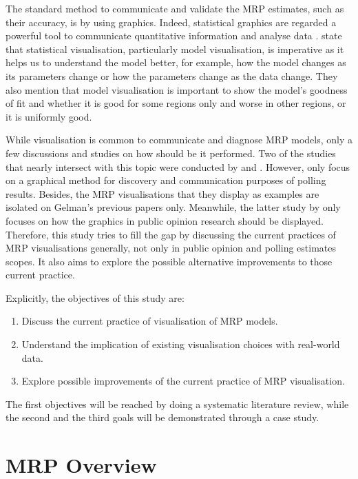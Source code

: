 \documentclass{monashthesis}
\begin{document}
The standard method to communicate and validate the MRP estimates, such as their accuracy, is by using graphics. Indeed, statistical graphics are regarded a powerful tool to communicate quantitative information and analyse data \autocite{ClevelandWilliamS,1983Gmfd}. \textcite{WickhamHadley2015VsmR} state that statistical visualisation, particularly model visualisation, is imperative as it helps us to understand the model better, for example, how the model changes as its parameters change or how the parameters change as the data change. They also mention that model visualisation is important to show the model's goodness of fit and whether it is good for some regions only and worse in other regions, or it is uniformly good.

While visualisation is common to communicate and diagnose MRP models, only a few discussions and studies on how should be it performed. Two of the studies that nearly intersect with this topic were conducted by \textcite{mekelagelman} and \textcite{saundra}. However, \textcite{mekelagelman} only focus on a graphical method for discovery and communication purposes of polling results. Besides, the MRP visualisations that they display as examples are isolated on Gelman's previous papers only. Meanwhile, the latter study by \textcite{saundra} only focuses on how the graphics in public opinion research should be displayed. Therefore, this study tries to fill the gap by discussing the current practices of MRP visualisations generally, not only in public opinion and polling estimates scopes. It also aims to explore the possible alternative improvements to those current practice.

Explicitly, the objectives of this study are:

\begin{enumerate}
\def\labelenumi{\arabic{enumi}.}
\tightlist
\item
  Discuss the current practice of visualisation of MRP models.
\item
  Understand the implication of existing visualisation choices with real-world data.
\item
  Explore possible improvements of the current practice of MRP visualisation.
\end{enumerate}

The first objectives will be reached by doing a systematic literature review, while the second and the third goals will be demonstrated through a case study.

\hypertarget{overview}{%
\section{MRP Overview}\label{overview}}
\end{document}
